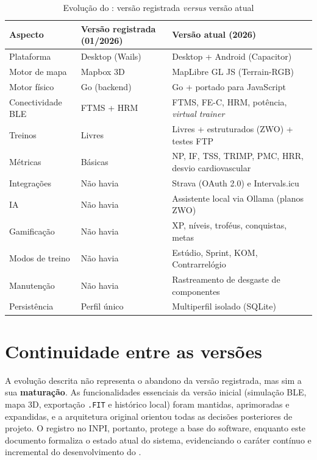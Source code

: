 \begin{table}[h]
    \centering
    \caption{Evolução do \argus{}: versão registrada \textit{versus} versão atual}
    \label{tab:evolucao}
    \small
    \begin{tabular}{
        >{\raggedright\arraybackslash}p{3.6cm}
        >{\raggedright\arraybackslash}p{5.4cm}
        >{\raggedright\arraybackslash}p{5.4cm}
    }
        \toprule
        \textbf{Aspecto} & \textbf{Versão registrada (01/2026)} &
        \textbf{Versão atual (2026)} \\
        \midrule
        Plataforma & Desktop (Wails) & Desktop + Android (Capacitor) \\
        Motor de mapa & Mapbox 3D & MapLibre GL JS (Terrain-RGB) \\
        Motor físico & Go (backend) & Go + portado para JavaScript \\
        Conectividade BLE & FTMS + HRM & FTMS, FE-C, HRM, potência, \textit{virtual trainer} \\
        Treinos & Livres & Livres + estruturados (ZWO) + testes FTP \\
        Métricas & Básicas & NP, IF, TSS, TRIMP, PMC, HRR, desvio cardiovascular \\
        Integrações & Não havia & Strava (OAuth 2.0) e Intervals.icu \\
        IA & Não havia & Assistente local via Ollama (planos ZWO) \\
        Gamificação & Não havia & XP, níveis, troféus, conquistas, metas \\
        Modos de treino & Não havia & Estúdio, Sprint, KOM, Contrarrelógio \\
        Manutenção & Não havia & Rastreamento de desgaste de componentes \\
        Persistência & Perfil único & Multiperfil isolado (SQLite) \\
        \bottomrule
    \end{tabular}
\end{table}

\section{Continuidade entre as versões}
\label{sec:continuidade}

A evolução descrita não representa o abandono da versão registrada, mas sim a
sua \textbf{maturação}. As funcionalidades essenciais da versão inicial
(simulação BLE, mapa 3D, exportação \texttt{.FIT} e histórico local) foram
mantidas, aprimoradas e expandidas, e
a arquitetura original orientou todas as decisões posteriores de projeto. O
registro no INPI, portanto, protege a base do software, enquanto este documento
formaliza o estado atual do sistema, evidenciando o caráter contínuo e
incremental do desenvolvimento do \argus{}.
